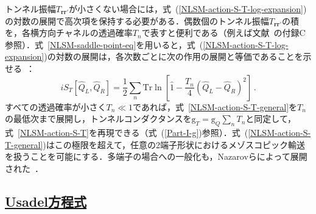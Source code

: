 \documentclass[a4paper,11pt]{ltjsarticle}
\newcommand{\subsectionlink}[1]{\subsection[#1]{\hyperlink{toc}{#1}}}
\def\Tr{\mathrm{Tr}}
\begin{document}
トンネル振幅$T_{\mathbf{rr}'}$が小さくない場合には，式~(\ref{NLSM-action-S-T-log-expansion})の対数の展開で高次項を保持する必要がある．偶数個のトンネル振幅$T_{\mathbf{rr}'}$の積を，各横方向チャネルの透過確率$T_n$で表すと便利である（例えば文献~\cite{ABG}の付録C参照）．式~\eqref{NLSM-saddle-point-eq}を用いると，式~(\ref{NLSM-action-S-T-log-expansion})の対数の展開は，各次数ごとに次の作用の展開と等価であることを示せる~\cite{Nazarov-TunnelingAction,BelzigNazarov,FKLS}：
\begin{equation}\label{NLSM-action-S-T-general}
iS_{T}[\hat Q_{L},\hat Q_{R}]=\frac{
1}{2}\sum_{n}\Tr\ln\left[\hat 1 - \frac{T_{n}}{4}
\left(\hat{Q}_{L}-\hat{Q}_{R}\right)^2 \right]\,.
\end{equation}
すべての透過確率が小さく$T_{n}\ll 1$であれば，式~\eqref{NLSM-action-S-T-general}を$T_{n}$の最低次まで展開し，トンネルコンダクタンスを$\mathrm{g}_{T}=\mathrm{g}_{Q}\sum_n T_n$と同定して，式~\eqref{NLSM-action-S-T}を再現できる（式~(\ref{Part-I-g})参照）．式~(\ref{NLSM-action-S-T-general})はこの極限を超えて，任意の2端子形状におけるメゾスコピック輸送を扱うことを可能にする．多端子の場合への一般化も，Nazarovらによって展開された~\cite{Nazarov-TunnelingAction,Nazarov-CBWTJ,SnymanNazarov}．



\subsectionlink{Usadel方程式}\label{sec_NLSM-4}
\end{document}
